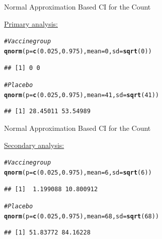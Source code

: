 \documentclass[10pt]{beamer}\usepackage[]{graphicx}\usepackage[]{color}
\makeatletter
\newcommand{\hlnum}[1]{\textcolor[rgb]{0.686,0.059,0.569}{#1}}%
\newcommand{\hlcom}[1]{\textcolor[rgb]{0.678,0.584,0.686}{\textit{#1}}}%
\newcommand{\hlstd}[1]{\textcolor[rgb]{0.345,0.345,0.345}{#1}}%
\newcommand{\hlkwc}[1]{\textcolor[rgb]{0.333,0.667,0.333}{#1}}%
\newcommand{\hlkwd}[1]{\textcolor[rgb]{0.737,0.353,0.396}{\textbf{#1}}}%
\newenvironment{kframe}{%
 \def\at@end@of@kframe{}%
 \ifinner\ifhmode%
  \def\at@end@of@kframe{\end{minipage}}%
  \begin{minipage}{\columnwidth}%
 \fi\fi%
 \def\FrameCommand##1{\hskip\@totalleftmargin \hskip-\fboxsep
 \colorbox{shadecolor}{##1}\hskip-\fboxsep
     \hskip-\linewidth \hskip-\@totalleftmargin \hskip\columnwidth}%
 \MakeFramed {\advance\hsize-\width
   \@totalleftmargin\z@ \linewidth\hsize
   \@setminipage}}%
 {\par\unskip\endMakeFramed%
 \at@end@of@kframe}
\newenvironment{knitrout}{}{} %
\makeatother
\begin{document}
\begin{frame}[fragile]{Normal Approximation Based CI for the Count}
	
	\underline{Primary analysis:}
	\vspace{0.1in}
\begin{knitrout}\tiny
{}\color{fgcolor}\begin{kframe}
\begin{alltt}
\hlcom{# Vaccine group}
\hlkwd{qnorm}\hlstd{(}\hlkwc{p} \hlstd{=} \hlkwd{c}\hlstd{(}\hlnum{0.025}\hlstd{,} \hlnum{0.975}\hlstd{),} \hlkwc{mean} \hlstd{=} \hlnum{0}\hlstd{,} \hlkwc{sd} \hlstd{=} \hlkwd{sqrt}\hlstd{(}\hlnum{0}\hlstd{))}
\end{alltt}
\begin{verbatim}
## [1] 0 0
\end{verbatim}
\begin{alltt}
\hlcom{# Placebo}
\hlkwd{qnorm}\hlstd{(}\hlkwc{p} \hlstd{=} \hlkwd{c}\hlstd{(}\hlnum{0.025}\hlstd{,} \hlnum{0.975}\hlstd{),} \hlkwc{mean} \hlstd{=} \hlnum{41}\hlstd{,} \hlkwc{sd} \hlstd{=} \hlkwd{sqrt}\hlstd{(}\hlnum{41}\hlstd{))}
\end{alltt}
\begin{verbatim}
## [1] 28.45011 53.54989
\end{verbatim}
\end{kframe}
\end{knitrout}
	
\end{frame}

\begin{frame}[fragile]{Normal Approximation Based CI for the Count}
	
	\underline{Secondary analysis:}
	\vspace{0.1in}
\begin{knitrout}\tiny
{}\color{fgcolor}\begin{kframe}
\begin{alltt}
\hlcom{# Vaccine group}
\hlkwd{qnorm}\hlstd{(}\hlkwc{p} \hlstd{=} \hlkwd{c}\hlstd{(}\hlnum{0.025}\hlstd{,} \hlnum{0.975}\hlstd{),} \hlkwc{mean} \hlstd{=} \hlnum{6}\hlstd{,} \hlkwc{sd} \hlstd{=} \hlkwd{sqrt}\hlstd{(}\hlnum{6}\hlstd{))}
\end{alltt}
\begin{verbatim}
## [1]  1.199088 10.800912
\end{verbatim}
\begin{alltt}
\hlcom{# Placebo}
\hlkwd{qnorm}\hlstd{(}\hlkwc{p} \hlstd{=} \hlkwd{c}\hlstd{(}\hlnum{0.025}\hlstd{,} \hlnum{0.975}\hlstd{),} \hlkwc{mean} \hlstd{=} \hlnum{68}\hlstd{,} \hlkwc{sd} \hlstd{=} \hlkwd{sqrt}\hlstd{(}\hlnum{68}\hlstd{))}
\end{alltt}
\begin{verbatim}
## [1] 51.83772 84.16228
\end{verbatim}
\end{kframe}
\end{knitrout}
	
\end{frame}
\end{document}
